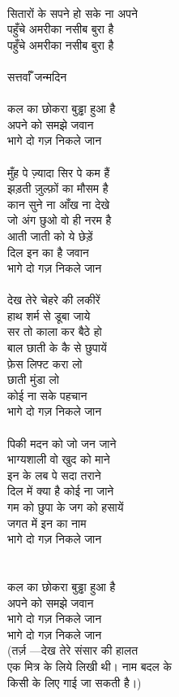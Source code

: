 {{{{{{{{{{{{{{{{{{{{{{{{{{{{{{{{\\
सितारों के सपने हो सके ना अपने\\
पहुँचे अमरीका नसीब बुरा है\\
पहुँचे अमरीका नसीब बुरा है\\
\\
सत्तर्वाँ जन्मदिन\\
\\
कल का छोकरा बुड्ढा हुआ है\\
अपने को समझे जवान\\
भागे दो गज़ निकले जान\\
\\
मुँह पे ज़्यादा सिर पे कम हैं\\
झड़ती ज़ुल्फ़ों का मौसम है\\
कान सुने ना आँख ना देखे\\
जो अंग छुओ वो ही नरम है\\
आती जाती को ये छेड़ें\\
दिल इन का है जवान\\
भागे दो गज़ निकले जान\\
\\
देख तेरे चेहरे की लकीरें\\
हाथ शर्म से डूबा जाये\\
सर तो काला कर बैठे हो\\
बाल छाती के कै से छुपायें\\
फ़ेस लिफ्ट करा लो\\
छाती मुंडा लो\\
कोई ना सके पहचान\\
भागे दो गज़ निकले जान\\
\\
पिकी मदन को जो जन जाने\\
भाग्यशाली वो खुद को माने\\
इन के लब पे सदा तराने\\
दिल में क्या है कोई ना जाने\\
गम को छुपा के जग को हसायें\\
जगत में इन का नाम \\
भागे दो गज़ निकले जान\\
\\
\\
कल का छोकरा बुड्ढा हुआ है\\
अपने को समझे जवान\\
भागे दो गज़ निकले जान\\
भागे दो गज़ निकले जान\\
(तर्ज़ —देख तेरे संसार की हालत\\
एक मित्र के लिये लिखी थी। नाम बदल के\\
किसी के लिए गाई जा सकती है।)\\
\\
\\
\\
\\
\\
\\
\\
\\
\\
\\
}}}}}}}}}}}}}}}}}}}}}}}}}}}}}}}}
